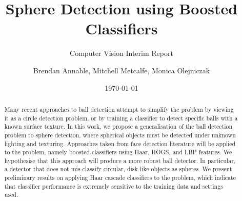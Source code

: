 \documentclass[11pt]{scrartcl}
\title{Sphere Detection using Boosted Classifiers}
\subtitle{Computer Vision Interim Report}
\author{Brendan Annable, Mitchell Metcalfe, Monica Olejniczak}
\date{\today}
\begin{document}
    \maketitle

    \begin{abstract}




        Many recent approaches to ball detection attempt to simplify the problem by viewing it as a circle detection problem, or by training a classifier to detect specific balls with a known surface texture.
        In this work, we propose a generalisation of the ball detection problem to sphere detection, where spherical objects must be detected under unknown lighting and texturing.
        Approaches taken from face detection literature will be applied to the problem, namely boosted-classifiers using Haar, HOGS, and LBP features.
        We hypothesise that this approach will produce a more robust ball detector. In particular, a detector that does not mis-classify circular, disk-like objects as spheres.
        We present preliminary results on applying Haar cascade classifiers to the problem, which indicate that classifier performance is extremely sensitive to the training data and settings used.


    \end{abstract}
\end{document}
